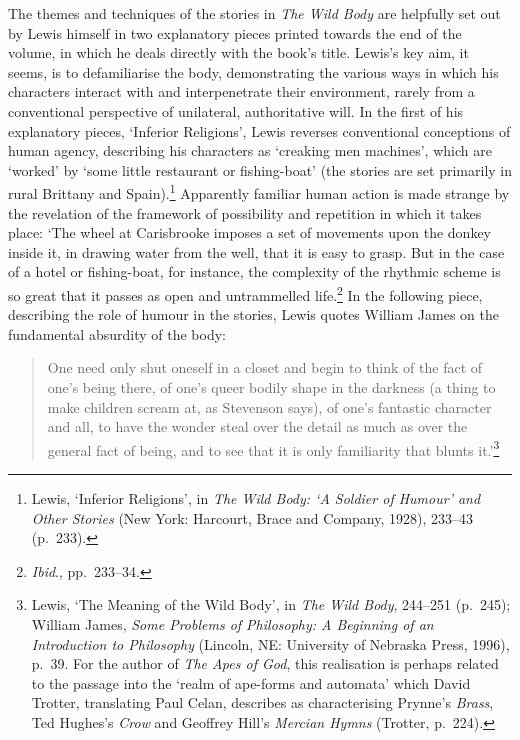 \documentclass[]{article}
\begin{document}
The themes and techniques of the stories in \emph{The Wild Body} are
helpfully set out by Lewis himself in two explanatory pieces printed
towards the end of the volume, in which he deals directly with the
book's title. Lewis's key aim, it seems, is to defamiliarise the body,
demonstrating the various ways in which his characters interact with and
interpenetrate their environment, rarely from a conventional perspective
of unilateral, authoritative will. In the first of his explanatory
pieces, `Inferior Religions', Lewis reverses conventional conceptions of
human agency, describing his characters as `creaking men machines',
which are `worked' by `some little restaurant or fishing-boat' (the
stories are set primarily in rural Brittany and Spain).\footnote{Lewis,
  `Inferior Religions', in \emph{The Wild Body: `A Soldier of Humour'
  and Other Stories} (New York: Harcourt, Brace and Company, 1928),
  233--43 (p.~233).} Apparently familiar human action is made strange by
the revelation of the framework of possibility and repetition in which
it takes place: `The wheel at Carisbrooke imposes a set of movements
upon the donkey inside it, in drawing water from the well, that it is
easy to grasp. But in the case of a hotel or fishing-boat, for instance,
the complexity of the rhythmic scheme is so great that it passes as open
and untrammelled life.\footnote{\emph{Ibid}., pp.~233--34.} In the
following piece, describing the role of humour in the stories, Lewis
quotes William James on the fundamental absurdity of the body:

\begin{quote}
One need only shut oneself in a closet and begin to think of the fact of
one's being there, of one's queer bodily shape in the darkness (a thing
to make children scream at, as Stevenson says), of one's fantastic
character and all, to have the wonder steal over the detail as much as
over the general fact of being, and to see that it is only familiarity
that blunts it.'\footnote{Lewis, `The Meaning of the Wild Body', in
  \emph{The Wild Body}, 244--251 (p.~245); William James, \emph{Some
  Problems of Philosophy: A Beginning of an Introduction to Philosophy}
  (Lincoln, NE: University of Nebraska Press, 1996), p.~39. For the
  author of \emph{The Apes of God}, this realisation is perhaps related
  to the passage into the `realm of ape-forms and automata' which David
  Trotter, translating Paul Celan, describes as characterising Prynne's
  \emph{Brass}, Ted Hughes's \emph{Crow} and Geoffrey Hill's
  \emph{Mercian Hymns} (Trotter, p.~224).}
\end{quote}
\end{document}
